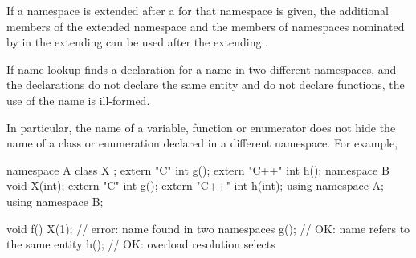 \pnum
If a namespace is extended after a
 for that namespace is given, the additional
members of the extended namespace and the members of namespaces
nominated by  in the
extending  can be used after the
extending .

\pnum
If name lookup finds a declaration for a name in two different
namespaces, and the declarations do not declare the same entity and do
not declare functions, the use of the name is ill-formed.
\begin{note}
In particular, the name of a variable, function or enumerator does not
hide the name of a class or enumeration declared in a different
namespace. For example,

\begin{codeblock}
namespace A {
  class X { };
  extern "C"   int g();
  extern "C++" int h();
}
namespace B {
  void X(int);
  extern "C"   int g();
  extern "C++" int h(int);
}
using namespace A;
using namespace B;

void f() {
  X(1);             // error: name  found in two namespaces
  g();              // OK: name  refers to the same entity
  h();              // OK: overload resolution selects 
}
\end{codeblock}
\end{note}

